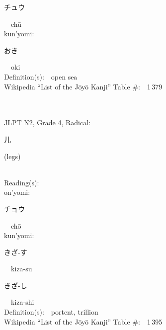\begin{multicols}{2}
{\hspace*{2em}}{\begin{CJK}{UTF8}{min} チュウ \end{CJK}}\ \ ch\=u\ \ \\
{\hspace*{1em}}kun'yomi:\ \ \\
{\hspace*{2em}}{\begin{CJK}{UTF8}{min} おき \end{CJK}}\ \ oki\ \ \\
Definition(s):\ \ open sea \\
Wikipedia ``List of the J\=oy\=o Kanji'' Table \#:\ \ 1\,379 \\
\ \ \\
{\fontsize{34pt}{40pt}  }\ \ \\  %
{JLPT N2, Grade 4, Radical:\ \ {\begin{CJK}{UTF8}{min} 儿 \end{CJK}} (legs) } \\
Reading(s):\ \ \\
{\hspace*{1em}}on'yomi:\ \ \\
{\hspace*{2em}}{\begin{CJK}{UTF8}{min} チョウ \end{CJK}}\ \ ch\=o\ \ \\
{\hspace*{1em}}kun'yomi:\ \ \\
{\hspace*{2em}}{\begin{CJK}{UTF8}{min} きざ-す \end{CJK}}\ \ kiza-su\ \ \\
{\hspace*{2em}}{\begin{CJK}{UTF8}{min} きざ-し \end{CJK}}\ \ kiza-shi\ \ \\
Definition(s):\ \ portent, trillion \\
Wikipedia ``List of the J\=oy\=o Kanji'' Table \#:\ \ 1\,395 \\
\ \ \\
{\fontsize{34pt}{40pt}  }\ \ \\  %

\end{multicols}
